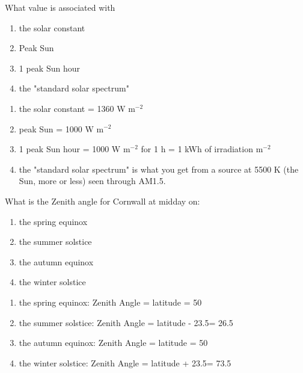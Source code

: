 \documentclass[class=scrartcl, crop=false,parskip=half]{standalone}
\begin{document}
\begin{question}
What value is associated with
    \begin{enumerate}[label=\alph*)]
        \item the solar constant
        \item Peak Sun
        \item 1 peak Sun hour
        \item the "standard solar spectrum"
    \end{enumerate}
\end{question}
\begin{solution}
    \begin{enumerate}[label=\alph*)]
        \item the solar constant = 1360 W m$^{-2}$
        \item peak Sun = 1000 W m$^{-2}$
        \item 1 peak Sun hour = 1000 W m$^{-2}$ for 1 h = 1 kWh of irradiation m$^{-2}$
        \item the "standard solar spectrum" is what you get from a source at 5500 K (the Sun, more or less) seen through AM1.5.
    \end{enumerate}
\end{solution}

\begin{question}
What is the Zenith angle for Cornwall at midday on:
    \begin{enumerate}[label=\alph*)]
        \item the spring equinox
        \item the summer solstice
        \item the autumn equinox
        \item the winter solstice
    \end{enumerate}
\end{question}
\begin{solution}
    \begin{enumerate}[label=\alph*)]
        \item the spring equinox: Zenith Angle = latitude = 50\degree
        \item the summer solstice: Zenith Angle = latitude - 23.5\degree = 26.5\degree
        \item the autumn equinox: Zenith Angle = latitude = 50\degree
        \item the winter solstice: Zenith Angle = latitude + 23.5\degree = 73.5\degree
    \end{enumerate}
\end{solution}
\end{document}
